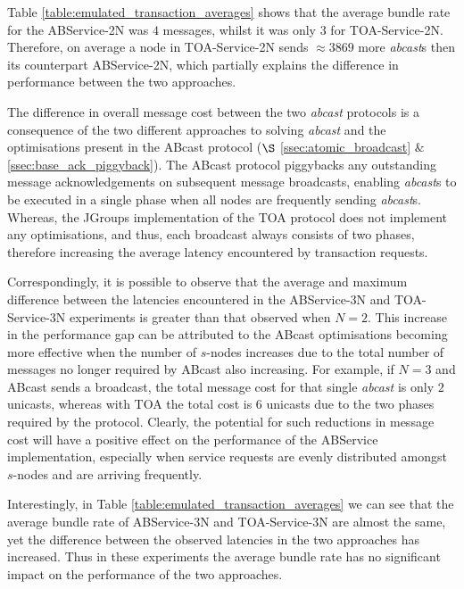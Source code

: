     Table \ref{table:emulated_transaction_averages} shows that the average bundle rate for the ABService-2N was $4$ messages, whilst it was only $3$ for TOA-Service-2N.  Therefore, on average a node in TOA-Service-2N sends $\approx 3869$ more \emph{abcast}s then its counterpart ABService-2N, which partially explains the difference in performance between the two approaches.  
    
    The difference in overall message cost between the two \emph{abcast} protocols is a consequence of the two different approaches to solving \emph{abcast} and the optimisations present in the \textsf{ABcast} protocol ($\S$  \ref{ssec:atomic_broadcast} $\&$ \ref{ssec:base_ack_piggyback}).  The \textsf{ABcast} protocol piggybacks any outstanding message acknowledgements on subsequent message broadcasts, enabling \emph{abcast}s to be executed in a single phase when all nodes are frequently sending \emph{abcast}s.  Whereas, the JGroups implementation of the TOA protocol does not implement any optimisations, and thus, each broadcast always consists of two phases, therefore increasing the average latency encountered by transaction requests.  
	
	Correspondingly, it is possible to observe that the average and maximum difference between the latencies encountered in the ABService-3N and TOA-Service-3N experiments is greater than that observed when $N = 2$.  This increase in the performance gap can be attributed to the \textsf{ABcast} optimisations becoming more effective when the number of $s$-nodes increases due to the total number of messages no longer required by \textsf{ABcast} also increasing.  For example, if $N = 3$ and \textsf{ABcast} sends a broadcast, the total message cost for that single \emph{abcast} is only $2$ unicasts, whereas with TOA the total cost is $6$ unicasts due to the two phases required by the protocol.  Clearly, the potential for such reductions in message cost will have a positive effect on the performance of the ABService implementation, especially when service requests are evenly distributed amongst $s$-nodes and are arriving frequently.  
	
    Interestingly, in Table \ref{table:emulated_transaction_averages} we can see that the average bundle rate of ABService-3N and TOA-Service-3N are almost the same, yet the difference between the observed latencies in the two approaches has increased.  	Thus in these experiments the average bundle rate has no significant impact on the performance of the two approaches.  
    
